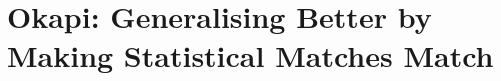 \chapter{Okapi: Generalising Better by Making Statistical Matches Match}\label{ch:okapi}

% 













%

